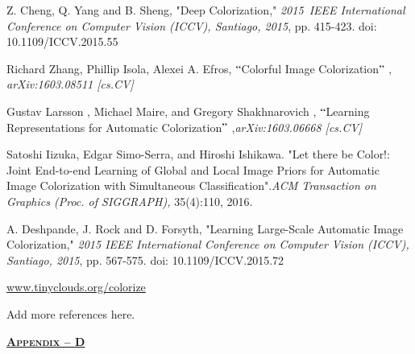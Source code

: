 \documentclass[12pt]{article}
\begin{document}
\begin{thebibliography}{99}

\vspace{\baselineskip}
Z. Cheng, Q. Yang and B. Sheng, "Deep Colorization," \textit{2015\ IEEE International  Conference on Computer Vision (ICCV), Santiago, 2015}, pp. 415-423. doi: 10.1109/ICCV.2015.55\par

Richard Zhang, Phillip Isola, Alexei A. Efros, $``$Colorful Image Colorization$"$ , \textit{arXiv:1603.08511 [cs.CV]}\par

Gustav Larsson , Michael Maire, and Gregory Shakhnarovich , $``$Learning Representations for Automatic Colorization$"$ ,\textit{arXiv:1603.06668 [cs.CV]}\par

Satoshi Iizuka, Edgar Simo-Serra, and Hiroshi Ishikawa. "Let there be Color!: Joint End-to-end Learning of Global and Local Image Priors for Automatic Image Colorization with Simultaneous Classification".\textit{ACM Transaction on Graphics (Proc. of SIGGRAPH),} 35(4):110, 2016.\par

A. Deshpande, J. Rock and D. Forsyth, "Learning Large-Scale Automatic Image Colorization," \textit{2015 IEEE International Conference on Computer Vision (ICCV), Santiago, 2015}, pp. 567-575. doi: 10.1109/ICCV.2015.72\par

\setlength{\parskip}{12.0pt}
\href{http://www.tinyclouds.org/colorize}{www.tinyclouds.org/colorize}\par

Add more references here.\par


\vspace{\baselineskip}
\setlength{\parskip}{9.96pt}

\end{thebibliography}
\setlength{\parskip}{6.0pt}



\newpage

\vspace{\baselineskip}
\vspace{\baselineskip}
\begin{Center}
\textbf{\textsc{\uline{Appendix – D}}}
\end{Center}\par
\end{document}
